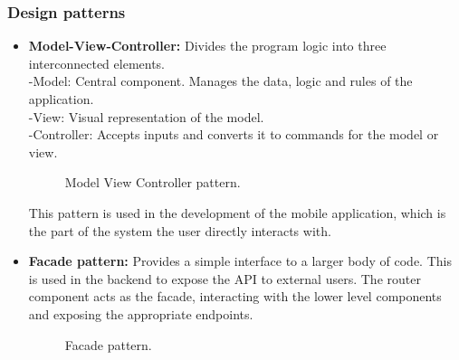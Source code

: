 \subsubsection{Design patterns}
\begin{itemize}
    \item
    \textbf{Model-View-Controller:} Divides the program logic into three interconnected elements.\\
        \hspace*{3ex}-\hspace*{2ex}Model: Central component. Manages the data, logic and rules of the application.\\
        \hspace*{3ex}-\hspace*{2ex}View: Visual representation of the model.\\
        \hspace*{3ex}-\hspace*{2ex}Controller: Accepts inputs and converts it to commands for the model or view.

    \begin{figure}[H]
    \centering
    \caption{\label{fig:mvc-pattern}Model View Controller pattern.}
    \end{figure}

    This pattern is used in the development of the mobile application, which is the part of the system the user directly interacts with.

    \item
    \textbf{Facade pattern:} Provides a simple interface to a larger body of code. This is used in the backend to expose the API to external users. The router component acts as the facade, interacting with the lower level components and exposing the appropriate endpoints.

    \begin{figure}[H]
    \centering
    \caption{\label{fig:facade-pattern}Facade pattern.}
    \end{figure}


\end{itemize}
